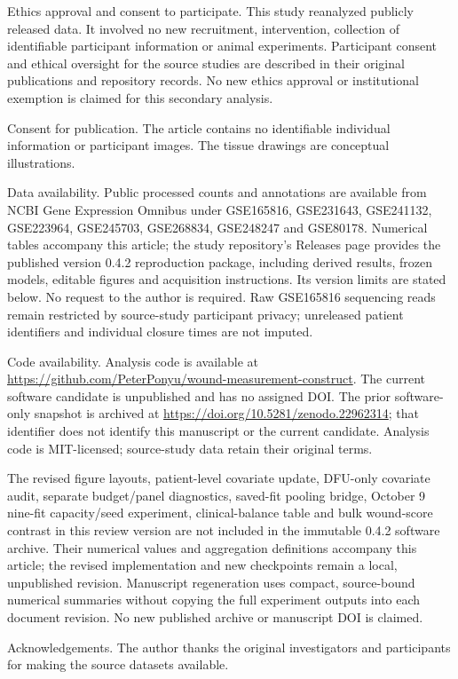 \documentclass[10pt,a4paper]{article}
\begin{document}
Ethics approval and consent to participate. This study reanalyzed publicly released data. It involved no new recruitment, intervention, collection of identifiable participant information or animal experiments. Participant consent and ethical oversight for the source studies are described in their original publications and repository records. No new ethics approval or institutional exemption is claimed for this secondary analysis.

Consent for publication. The article contains no identifiable individual information or participant images. The tissue drawings are conceptual illustrations.

Data availability. Public processed counts and annotations are available from NCBI Gene Expression Omnibus under GSE165816, GSE231643, GSE241132, GSE223964, GSE245703, GSE268834, GSE248247 and GSE80178. Numerical tables accompany this article; the study repository's Releases page provides the published version 0.4.2 reproduction package, including derived results, frozen models, editable figures and acquisition instructions. Its version limits are stated below. No request to the author is required. Raw GSE165816 sequencing reads remain restricted by source-study participant privacy; unreleased patient identifiers and individual closure times are not imputed.

Code availability. Analysis code is available at \url{https://github.com/PeterPonyu/wound-measurement-construct}. The current software candidate is unpublished and has no assigned DOI. The prior software-only snapshot is archived at \url{https://doi.org/10.5281/zenodo.22962314}; that identifier does not identify this manuscript or the current candidate. Analysis code is MIT-licensed; source-study data retain their original terms.

The revised figure layouts, patient-level covariate update, DFU-only covariate audit, separate budget/panel diagnostics, saved-fit pooling bridge, October 9 nine-fit capacity/seed experiment, clinical-balance table and bulk wound-score contrast in this review version are not included in the immutable 0.4.2 software archive. Their numerical values and aggregation definitions accompany this article; the revised implementation and new checkpoints remain a local, unpublished revision. Manuscript regeneration uses compact, source-bound numerical summaries without copying the full experiment outputs into each document revision. No new published archive or manuscript DOI is claimed.

Acknowledgements. The author thanks the original investigators and participants for making the source datasets available.
\FloatBarrier



\end{document}

